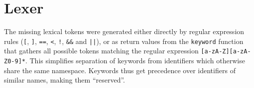 \section{Lexer}
The missing lexical tokens were generated either directly by regular expression
rules (\verb+[+, \verb+]+, \verb+==+, \verb+<+, \verb+!+, \verb+&&+ and
\verb+||+), or as return values from the \verb+keyword+ function that gathers
all possible tokens matching the regular expression
\verb+[a-zA-Z][a-zA-Z0-9]*+. This simplifies separation of keywords from
identifiers which otherwise share the same namespace. Keywords thus get
precedence over identifiers of similar names, making them ``reserved''.

